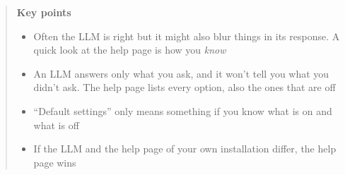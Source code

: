\documentclass[
  letterpaper,
  DIV=11,
  numbers=noendperiod]{scrreprt}
\providecommand{\tightlist}{%
  \setlength{\itemsep}{0pt}\setlength{\parskip}{0pt}}
\begin{document}
\begin{tcolorbox}
\begin{quote}
\textbf{Key points}

\begin{itemize}
\tightlist
\item
  Often the LLM is right but it might also blur things in its response.
  A quick look at the help page is how you \emph{know}
\item
  An LLM answers only what you ask, and it won't tell you what you
  didn't ask. The help page lists every option, also the ones that are
  off
\item
  ``Default settings'' only means something if you know what is on and
  what is off
\item
  If the LLM and the help page of your own installation differ, the help
  page wins
\end{itemize}
\end{quote}

\end{tcolorbox}
\end{document}
